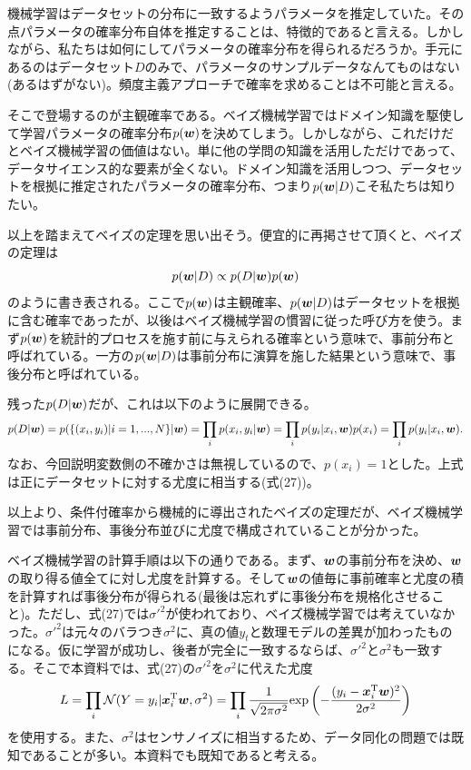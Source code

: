 \documentclass[dvipdfmx, 9pt, a4paper]{jsarticle}
\newcommand{\bm}[1]{{\mbox{\boldmath $#1$}}}
\begin{document}
機械学習はデータセットの分布に一致するようパラメータを推定していた。その点パラメータの確率分布自体を推定することは、特徴的であると言える。しかしながら、私たちは如何にしてパラメータの確率分布を得られるだろうか。手元にあるのはデータセット$D$のみで、パラメータのサンプルデータなんてものはない(あるはずがない)。頻度主義アプローチで確率を求めることは不可能と言える。\par
そこで登場するのが主観確率である。ベイズ機械学習ではドメイン知識を駆使して学習パラメータの確率分布$p(\bm w)$を決めてしまう。しかしながら、これだけだとベイズ機械学習の価値はない。単に他の学問の知識を活用しただけであって、データサイエンス的な要素が全くない。ドメイン知識を活用しつつ、データセットを根拠に推定されたパラメータの確率分布、つまり$p(\bm w|D)$こそ私たちは知りたい。\par
以上を踏まえてベイズの定理を思い出そう。便宜的に再掲させて頂くと、ベイズの定理は
\begin{equation}
p(\bm w|D)\propto p(D|\bm w)p(\bm w) \notag
\end{equation}
のように書き表される。ここで$p(\bm w)$は主観確率、$p(\bm w|D)$はデータセットを根拠に含む確率であったが、以後はベイズ機械学習の慣習に従った呼び方を使う。まず$p(\bm w)$を統計的プロセスを施す前に与えられる確率という意味で、事前分布と呼ばれている。一方の$p(\bm w|D)$は事前分布に演算を施した結果という意味で、事後分布と呼ばれている。\par
残った$p(D|\bm w)$だが、これは以下のように展開できる。
\begin{equation}
p(D|\bm w)=p(\{ (x_i, y_i)|i=1,...,N \}|\bm w)=\prod_i p(x_i, y_i|\bm w)=\prod_ip(y_i|x_i, \bm w)p(x_i)=\prod_ip(y_i|x_i, \bm w). \notag
\end{equation}
なお、今回説明変数側の不確かさは無視しているので、$p(x_i)=1$とした。上式は正にデータセットに対する尤度に相当する(式(27))。\par
以上より、条件付確率から機械的に導出されたベイズの定理だが、ベイズ機械学習では事前分布、事後分布並びに尤度で構成されていることが分かった。\par
ベイズ機械学習の計算手順は以下の通りである。まず、$\bm w$の事前分布を決め、$\bm w$の取り得る値全てに対し尤度を計算する。そして$\bm w$の値毎に事前確率と尤度の積を計算すれば事後分布が得られる(最後は忘れずに事後分布を規格化させること)。ただし、式(27)では$\sigma'^2$が使われており、ベイズ機械学習では考えていなかった。$\sigma'^2$は元々のバラつき$\sigma^2$に、真の値$y_t$と数理モデルの差異が加わったものになる。仮に学習が成功し、後者が完全に一致するならば、$\sigma'^2$と$\sigma^2$も一致する。そこで本資料では、式(27)の$\sigma'^2$を$\sigma^2$に代えた尤度
\begin{equation}
L=\prod_i \mathcal{N}(Y=y_i|\bm x_i^{\rm T}\bm w, \sigma^2)
=\prod_i \frac{1}{\sqrt{2\pi\sigma^2}}{\rm exp}\left(
-\frac{(y_i-\bm x_i^{\rm T}\bm w)^2}{2\sigma^2}
\right)
\end{equation}
を使用する。また、$\sigma^2$はセンサノイズに相当するため、データ同化の問題では既知であることが多い。本資料でも既知であると考える。
\end{document}
